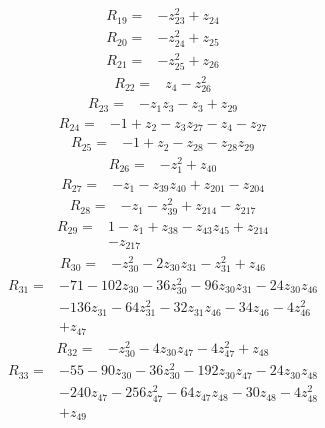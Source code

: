 \begin{align*}
R_{19}={}&-z_{23}^{2}+z_{24}
\end{align*}
\begin{align*}
R_{20}={}&-z_{24}^{2}+z_{25}
\end{align*}
\begin{align*}
R_{21}={}&-z_{25}^{2}+z_{26}
\end{align*}
\begin{align*}
R_{22}={}&z_{4}-z_{26}^{2}
\end{align*}
\begin{align*}
R_{23}={}&-z_{1}z_{3}-z_{3}+z_{29}
\end{align*}
\begin{align*}
R_{24}={}&-1+z_{2}-z_{3}z_{27}-z_{4}-z_{27}
\end{align*}
\begin{align*}
R_{25}={}&-1+z_{2}-z_{28}-z_{28}z_{29}
\end{align*}
\begin{align*}
R_{26}={}&-z_{1}^{2}+z_{40}
\end{align*}
\begin{align*}
R_{27}={}&-z_{1}-z_{39}z_{40}+z_{201}-z_{204}
\end{align*}
\begin{align*}
R_{28}={}&-z_{1}-z_{39}^{2}+z_{214}-z_{217}
\end{align*}
\begin{align*}
R_{29}={}&1-z_{1}+z_{38}-z_{43}z_{45}+z_{214}\\
&-z_{217}
\end{align*}
\begin{align*}
R_{30}={}&-z_{30}^{2}-2z_{30}z_{31}-z_{31}^{2}+z_{46}
\end{align*}
\begin{align*}
R_{31}={}&-71-102z_{30}-36z_{30}^{2}-96z_{30}z_{31}-24z_{30}z_{46}\\
&-136z_{31}-64z_{31}^{2}-32z_{31}z_{46}-34z_{46}-4z_{46}^{2}\\
&+z_{47}
\end{align*}
\begin{align*}
R_{32}={}&-z_{30}^{2}-4z_{30}z_{47}-4z_{47}^{2}+z_{48}
\end{align*}
\begin{align*}
R_{33}={}&-55-90z_{30}-36z_{30}^{2}-192z_{30}z_{47}-24z_{30}z_{48}\\
&-240z_{47}-256z_{47}^{2}-64z_{47}z_{48}-30z_{48}-4z_{48}^{2}\\
&+z_{49}
\end{align*}
